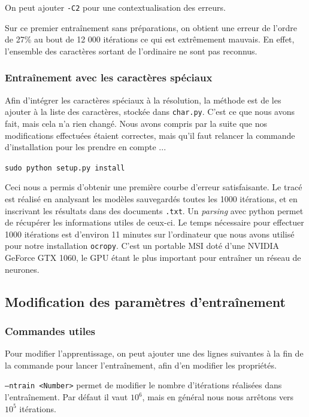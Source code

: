 \documentclass{report}
\begin{document}
On peut ajouter \texttt{-C2} pour une contextualisation des erreurs.

Sur ce premier entraînement sans préparations, on obtient une erreur de l'ordre de 27\% au bout de 12 000 itérations ce qui est extrêmement mauvais. En effet, l'ensemble des caractères sortant de l'ordinaire ne sont pas reconnus.

\subsubsection{Entraînement avec les caractères spéciaux}

Afin d'intégrer les caractères spéciaux à la résolution, la méthode est de les ajouter à la liste des caractères, stockée dans \texttt{char.py}. C'est ce que nous avons fait, mais cela n'a rien changé. Nous avons compris par la suite que nos modifications effectuées étaient correctes, mais qu'il faut relancer la commande d'installation pour les prendre en compte ...

\begin{center}
    \texttt{sudo python setup.py install}
\end{center}

Ceci nous a permis d'obtenir une première courbe d'erreur satisfaisante.
Le tracé est réalisé en analysant les modèles sauvegardés toutes les 1000 itérations, et en inscrivant les résultats dans des documents \texttt{.txt}.
Un \textit{parsing} avec python permet de récupérer les informations utiles de ceux-ci. 
Le temps nécessaire pour effectuer 1000 itérations est d'environ 11 minutes sur l'ordinateur que nous avons utilisé pour notre installation \texttt{ocropy}.
C'est un portable MSI doté d'une NVIDIA GeForce GTX 1060, le GPU étant le plus important pour entraîner un réseau de neurones.


\subsection{Modification des paramètres d'entraînement}

\subsubsection{Commandes utiles}

Pour modifier l'apprentissage, on peut ajouter une des lignes suivantes à la fin de la commande pour lancer l'entraînement, afin d'en modifier les propriétés.

\texttt{--ntrain <Number>} permet de modifier le nombre d'itérations réalisées dans l'entraînement.
Par défaut il vaut $10^6$, mais en général nous nous arrêtons vers $10^5$ itérations.
\end{document}
